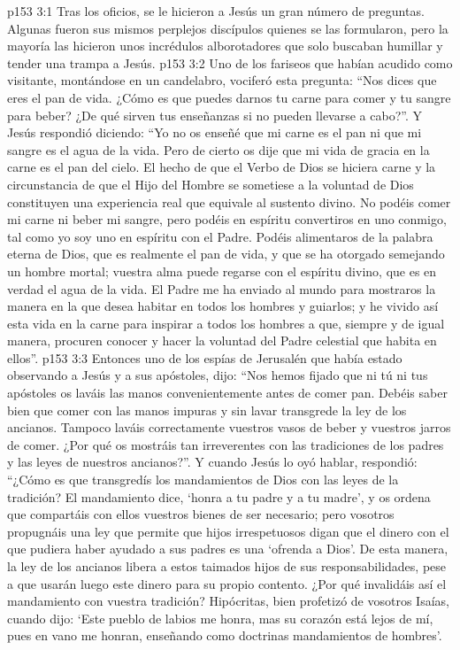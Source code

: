 \vs p153 3:1 Tras los oficios, se le hicieron a Jesús un gran número de preguntas. Algunas fueron sus mismos perplejos discípulos quienes se las formularon, pero la mayoría las hicieron unos incrédulos alborotadores que solo buscaban humillar y tender una trampa a Jesús.
\vs p153 3:2 Uno de los fariseos que habían acudido como visitante, montándose en un candelabro, vociferó esta pregunta: “Nos dices que eres el pan de vida. ¿Cómo es que puedes darnos tu carne para comer y tu sangre para beber? ¿De qué sirven tus enseñanzas si no pueden llevarse a cabo?”. Y Jesús respondió diciendo: “Yo no os enseñé que mi carne es el pan ni que mi sangre es el agua de la vida. Pero de cierto os dije que mi vida de gracia en la carne es el pan del cielo. El hecho de que el Verbo de Dios se hiciera carne y la circunstancia de que el Hijo del Hombre se sometiese a la voluntad de Dios constituyen una experiencia real que equivale al sustento divino. No podéis comer mi carne ni beber mi sangre, pero podéis en espíritu convertiros en uno conmigo, tal como yo soy uno en espíritu con el Padre. Podéis alimentaros de la palabra eterna de Dios, que es realmente el pan de vida, y que se ha otorgado semejando un hombre mortal; vuestra alma puede regarse con el espíritu divino, que es en verdad el agua de la vida. El Padre me ha enviado al mundo para mostraros la manera en la que desea habitar en todos los hombres y guiarlos; y he vivido así esta vida en la carne para inspirar a todos los hombres a que, siempre y de igual manera, procuren conocer y hacer la voluntad del Padre celestial que habita en ellos”.
\vs p153 3:3 Entonces uno de los espías de Jerusalén que había estado observando a Jesús y a sus apóstoles, dijo: “Nos hemos fijado que ni tú ni tus apóstoles os laváis las manos convenientemente antes de comer pan. Debéis saber bien que comer con las manos impuras y sin lavar transgrede la ley de los ancianos. Tampoco laváis correctamente vuestros vasos de beber y vuestros jarros de comer. ¿Por qué os mostráis tan irreverentes con las tradiciones de los padres y las leyes de nuestros ancianos?”. Y cuando Jesús lo oyó hablar, respondió: “¿Cómo es que transgredís los mandamientos de Dios con las leyes de la tradición? El mandamiento dice, ‘honra a tu padre y a tu madre’, y os ordena que compartáis con ellos vuestros bienes de ser necesario; pero vosotros propugnáis una ley que permite que hijos irrespetuosos digan que el dinero con el que pudiera haber ayudado a sus padres es una ‘ofrenda a Dios’. De esta manera, la ley de los ancianos libera a estos taimados hijos de sus responsabilidades, pese a que usarán luego este dinero para su propio contento. ¿Por qué invalidáis así el mandamiento con vuestra tradición? Hipócritas, bien profetizó de vosotros Isaías, cuando dijo: ‘Este pueblo de labios me honra, mas su corazón está lejos de mí, pues en vano me honran, enseñando como doctrinas mandamientos de hombres’.
